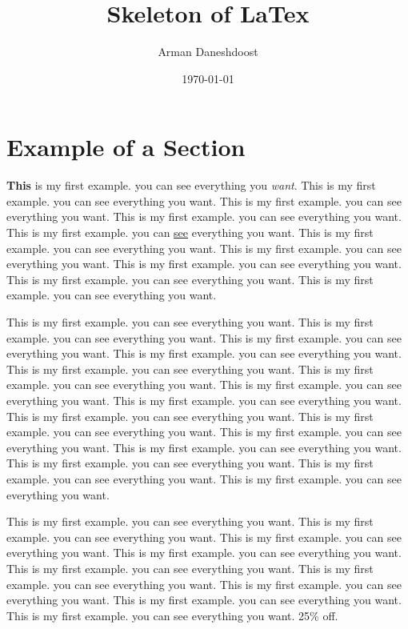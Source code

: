 \documentclass{article}
\title{Skeleton of LaTex}
\author{Arman Daneshdoost}
\date{\today}
\begin{document}
\maketitle

\tableofcontents


\section{Example of a Section} %
\textbf{This} is my first example. you can see everything you \textit{want}. This is my first example. you can see everything you want.
This is my first example. you can see everything you want. This is my first example. you can see everything you want.
This is my first example. you can \underline{see} everything you want. This is my first example. you can see everything you want.
This is my first example. you can see everything you want. This is my first example. you can see everything you want.
This is my first example. you can see everything you want. This is my first example. you can see everything you want.

This is my first example. you can see everything you want. This is my first example. you can see everything you want. This is my first example. you can see everything you want. This is my first example. you can see everything you want.
This is my first example. you can see everything you want. This is my first example. you can see everything you want.
This is my first example. you can see everything you want. This is my first example. you can see everything you want.
This is my first example. you can see everything you want. This is my first example. you can see everything you want.
This is my first example. you can see everything you want. This is my first example. you can see everything you want.
This is my first example. you can see everything you want. This is my first example. you can see everything you want. This is my first example. you can see everything you want. \par This is my first example. you can see everything you want.
This is my first example. you can see everything you want. \newline This is my first example. you can see everything you want.
This is my first example. you can see everything you want. This is my first example. you can see everything you want.
This is my first example. you can see everything you want. This is my first example. you can see everything you want.
This is my first example. you can see everything you want. This is my first example. you can see everything you want. 25\% off. %
\end{document}
